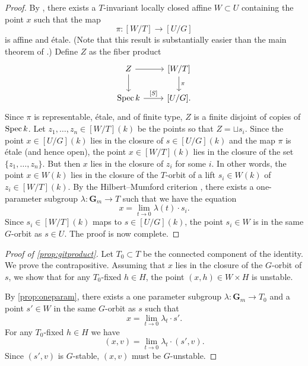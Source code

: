 \documentclass[12pt,reqno]{amsart}
\renewcommand{\k}{k}
\renewcommand{\to}{{\longrightarrow}}
\numberwithin{equation}{section}
\newcommand{\G}{\mathbf G}
\begin{document}
\begin{proof}
  By \cite[Theorem~3]{alp:10}, there exists a $T$-invariant locally closed affine $W \subset U$ containing the point $x$ such that the map
  \[ \pi \colon [W/T] \to [U / G]\]
  is affine and \'etale.
  (Note that this result is substantially easier than the main theorem of \cite{alp.hal.ryd:20}.)
  Define $Z$ as the fiber product
  \[
    \begin{tikzcd}
      Z \ar{r}\ar{d}& {[W/T]}\ar{d}{\pi}\\
      \spec \k \ar{r}{[S]}& {[U/G]}.
    \end{tikzcd}
  \]
  Since $\pi$ is representable, \'etale, and of finite type, $Z$ is a finite disjoint of copies of $\spec \k$.
  Let $z_1, \dots, z_n \in [W/T](\k)$ be the points so that $Z = \sqcup s_i$.
  Since the point $x \in [U/G](\k)$ lies in the closure of $s \in [U/G](\k)$ and the map $\pi$ is \'etale (and hence open), the point $x \in [W/T](\k)$ lies in the closure of the set $\{z_1,\dots, z_n\}$.
  But then $x$ lies in the closure of $z_i$ for some $i$.
  In other words, the point $x \in W(\k)$ lies in the closure of the $T$-orbit of a lift $s_i \in W(\k)$ of $z_i \in [W/T](\k)$.
  By the Hilbert--Mumford criterion \cite[Theorem~1.4]{kem:78}, there exists a one-parameter subgroup $\lambda \colon \G_m \to T$ such that we have the equation
  \begin{equation}\label{eqn:specialization}
    x = \lim_{t \to 0} \lambda (t) \cdot s_i.
  \end{equation}
  Since $s_i \in [W/T](\k)$ maps to $s \in [U/G](\k)$, the point $s_i \in W$ is in the same $G$-orbit as $s \in U$.
  The proof is now complete.
\end{proof}

\begin{proof}[Proof of \autoref{prop:gitproduct}]
  Let $T_0 \subset T$ be the connected  component of the identity.
  We prove the contrapositive.
  Assuming that $x$ lies in the closure of the $G$-orbit of $s$, we show that for any $T_0$-fixed $h \in H$, the point $(x, h) \in W \times H$ is unstable.

  By \autoref{prop:oneparam}, there exists a one parameter subgroup $\lambda \colon \G_m \to T_0$ and a point $s' \in W$ in the same $G$-orbit as $s$ such that
  \[ x = \lim_{t \to 0} \lambda_t \cdot s'.\]
  For any $T_0$-fixed $h \in H$ we have
  \[
    (x, v) = \lim_{t \to 0} \lambda_t \cdot (s', v).
  \]
  Since $(s',v)$ is $G$-stable, $(x,v)$ must be $G$-unstable.
\end{proof}
\end{document}
